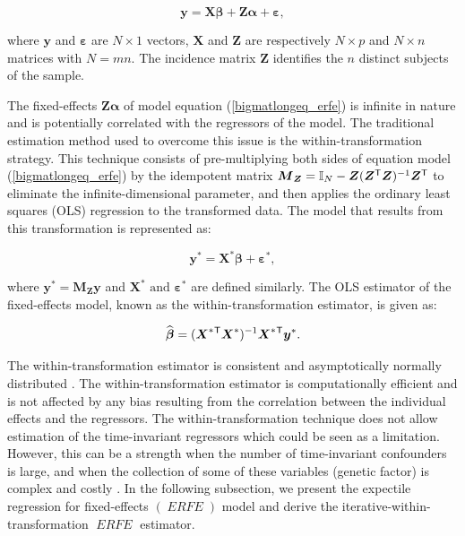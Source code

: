 \documentclass[15pt,a4paper]{article}
\newcommand{\transpose}{{}^{\text{\sffamily T}}}
\DeclareMathOperator{\ERFE}{\textit{ERFE}}
\begin{document}
\begin{equation}\label{bigmatlongeq_erfe} 
    \boldsymbol{y} = \boldsymbol{X}\boldsymbol{\beta} + \boldsymbol{Z}\boldsymbol{\alpha} + \boldsymbol{\varepsilon},
\end{equation}

where \(\boldsymbol{y}\) and \(\boldsymbol{\varepsilon}\) are \(N\times 1\) vectors, \(\boldsymbol{X}\) and \(\boldsymbol{Z}\) are respectively \(N\times p\) and \(N\times n\) matrices with \(N=mn.\) The incidence matrix \(\boldsymbol{Z}\) identifies the \(n\) distinct subjects of the sample. 


The fixed-effects $\boldsymbol{Z}\boldsymbol{\alpha}$ of model equation (\ref{bigmatlongeq_erfe}) is infinite in nature and is potentially correlated with the regressors of the model. The traditional estimation method used to overcome this issue is the within-transformation strategy. This technique consists of pre-multiplying both sides of equation model (\ref{bigmatlongeq_erfe}) by the idempotent matrix \(\boldsymbol{M}_{\boldsymbol{Z}}=\mathbb{I}_N-\boldsymbol{Z}(\boldsymbol{Z}\transpose\boldsymbol{Z})^{-1}\boldsymbol{Z}\transpose\) to eliminate the infinite-dimensional parameter, and then applies the ordinary least squares (OLS) regression to the transformed data. The model that results from this transformation is represented as: 

\begin{equation}\label{ols_model_erfe} 
    \boldsymbol{y}^{*} = \boldsymbol{X}^{*}\boldsymbol{\beta} + \boldsymbol{\varepsilon}^{*},
\end{equation}

where \(\boldsymbol{y}^{*}=\boldsymbol{M}_{\boldsymbol{Z}}\boldsymbol{y}\) and \(\boldsymbol{X}^{*} \mbox{ and } \boldsymbol{\varepsilon}^{*}\) are defined similarly. The OLS estimator of the fixed-effects model, known as the within-transformation estimator, is given as:


\begin{equation}\label{ols_est_erfe} 
    \widehat{\boldsymbol{\beta}} = (\boldsymbol{X}^{*}\transpose\boldsymbol{X}^{*})^{-1}\boldsymbol{X}^{*}\transpose\boldsymbol{y}^{*}.
\end{equation}

The within-transformation estimator is consistent and asymptotically normally distributed \citep{Greene2011}. The within-transformation estimator is computationally efficient and is not affected by any bias resulting from the correlation between the individual effects and the regressors. The within-transformation technique does not allow estimation of the time-invariant regressors which could be seen as a limitation. However, this can be a strength when the number of time-invariant confounders is large, and when the collection of some of these variables (genetic factor) is complex and costly \citep{bruderlFixedEffectsPanelRegression2014}. In the following subsection, we present the expectile regression for fixed-effects $(\ERFE)$ model and derive the iterative-within-transformation $\ERFE$ estimator.
\end{document}
